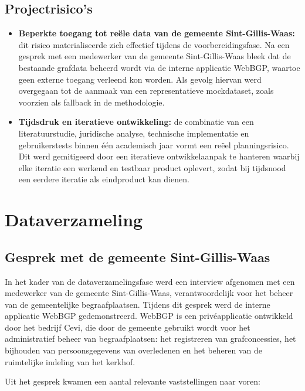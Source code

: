 \subsection{Projectrisico's}

\begin{itemize}
    \item \textbf{Beperkte toegang tot reële data van de gemeente Sint-Gillis-Waas:} dit risico materialiseerde zich effectief tijdens de voorbereidingsfase. Na een gesprek met een medewerker van de gemeente Sint-Gillis-Waas bleek dat de bestaande grafdata beheerd wordt via de interne applicatie WebBGP, waartoe geen externe toegang verleend kon worden. Als gevolg hiervan werd overgegaan tot de aanmaak van een representatieve mockdataset, zoals voorzien als fallback in de methodologie.
    
    \item \textbf{Tijdsdruk en iteratieve ontwikkeling:} de combinatie van een literatuurstudie, juridische analyse, technische implementatie en gebruikerstests binnen één academisch jaar vormt een reëel planningsrisico. Dit werd gemitigeerd door een iteratieve ontwikkelaanpak te hanteren waarbij elke iteratie een werkend en testbaar product oplevert, zodat bij tijdsnood een eerdere iteratie als eindproduct kan dienen.
\end{itemize}

\section{Dataverzameling}

\subsection{Gesprek met de gemeente Sint-Gillis-Waas}

In het kader van de dataverzamelingsfase werd een interview afgenomen met een medewerker van de gemeente Sint-Gillis-Waas, verantwoordelijk voor het beheer van de gemeentelijke begraafplaatsen. Tijdens dit gesprek werd de interne applicatie WebBGP gedemonstreerd. WebBGP is een privéapplicatie ontwikkeld door het bedrijf Cevi, die door de gemeente gebruikt wordt voor het administratief beheer van begraafplaatsen: het registreren van grafconcessies, het bijhouden van persoonsgegevens van overledenen en het beheren van de ruimtelijke indeling van het kerkhof.

Uit het gesprek kwamen een aantal relevante vaststellingen naar voren:

